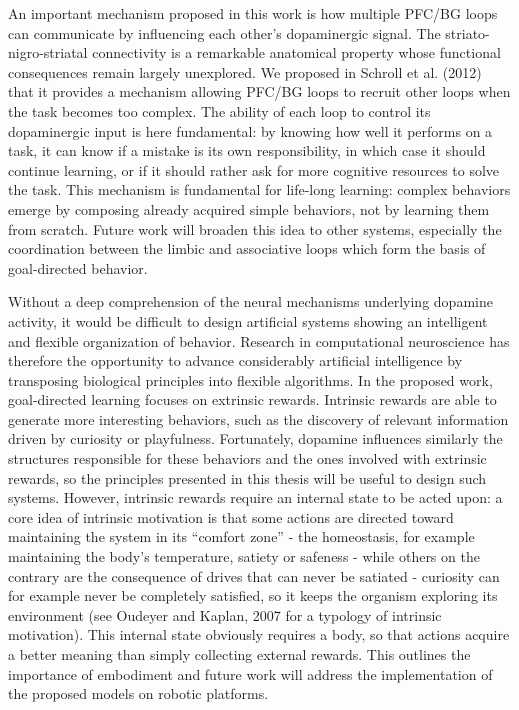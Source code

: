 \documentclass[
  11pt,
  a4paper,
]{scrbook}
\begin{document}
An important mechanism proposed in this work is how multiple PFC/BG
loops can communicate by influencing each other's dopaminergic signal.
The striato-nigro-striatal connectivity is a remarkable anatomical
property whose functional consequences remain largely unexplored. We
proposed in Schroll et al. (2012) that it provides a mechanism allowing
PFC/BG loops to recruit other loops when the task becomes too complex.
The ability of each loop to control its dopaminergic input is here
fundamental: by knowing how well it performs on a task, it can know if a
mistake is its own responsibility, in which case it should continue
learning, or if it should rather ask for more cognitive resources to
solve the task. This mechanism is fundamental for life-long learning:
complex behaviors emerge by composing already acquired simple behaviors,
not by learning them from scratch. Future work will broaden this idea to
other systems, especially the coordination between the limbic and
associative loops which form the basis of goal-directed behavior.

Without a deep comprehension of the neural mechanisms underlying
dopamine activity, it would be difficult to design artificial systems
showing an intelligent and flexible organization of behavior. Research
in computational neuroscience has therefore the opportunity to advance
considerably artificial intelligence by transposing biological
principles into flexible algorithms. In the proposed work, goal-directed
learning focuses on extrinsic rewards. Intrinsic rewards are able to
generate more interesting behaviors, such as the discovery of relevant
information driven by curiosity or playfulness. Fortunately, dopamine
influences similarly the structures responsible for these behaviors and
the ones involved with extrinsic rewards, so the principles presented in
this thesis will be useful to design such systems. However, intrinsic
rewards require an internal state to be acted upon: a core idea of
intrinsic motivation is that some actions are directed toward
maintaining the system in its ``comfort zone'' - the homeostasis, for
example maintaining the body's temperature, satiety or safeness - while
others on the contrary are the consequence of drives that can never be
satiated - curiosity can for example never be completely satisfied, so
it keeps the organism exploring its environment (see Oudeyer and Kaplan,
2007 for a typology of intrinsic motivation). This internal state
obviously requires a body, so that actions acquire a better meaning than
simply collecting external rewards. This outlines the importance of
embodiment and future work will address the implementation of the
proposed models on robotic platforms.
\end{document}
